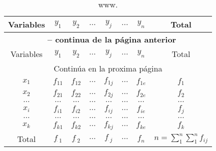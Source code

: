 \documentclass[a4paper]{report}
\begin{document}
\begin{longtable}{|c|cccccc|c|}
	\caption{www.}
	\label{tab:w}                                                                                                                     \\
	\hline
	Variables & $y_1$           & $y_2$           & $\ldots$ & $y_{j}$         & $\ldots$ & $y_n$    & Total                          \\
	\hline
	\endfirsthead
	\multicolumn{8}{c}{{\bfseries \tablename\ \thetable{} -- continua de la página anterior}}                                         \\
	\hline
	Variables & $y_1$           & $y_2$           & $\ldots$ & $y_{j}$         & $\ldots$ & $y_n$    & Total                          \\
	\hline
	\endhead
	\hline
	\multicolumn{8}{c}{{Continúa en la proxima página}}                                                                               \\
	\hline
	\endfoot
	\hline
	\endlastfoot
	$x_1$     & $f_{11}$        & $f_{12}$        & $\ldots$ & $f_{1j}$        & $\ldots$ & $f_{1e}$ & $f_1$                          \\
	$x_2$     & $f_{21}$        & $f_{22}$        & $\ldots$ & $f_{2j}$        & $\ldots$ & $f_{2e}$ & $f_2$                          \\
	$\ldots$  & $\ldots$        & $\ldots$        & $\ldots$ & $\ldots$        & $\ldots$ & $\ldots$ & $\ldots$                       \\
	$x_i$     & $f_{i1}$        & $f_{i2}$        & $\ldots$ & $f_{ij}$        & $\ldots$ & $f_{ie}$ & $f_j$                          \\
	$\ldots$  & $\ldots$        & $\ldots$        & $\ldots$ & $\ldots$        & $\ldots$ & $\ldots$ & $\ldots$                       \\
	$x_k$     & $f_{k1}$        & $f_{k2}$        & $\ldots$ & $f_{kj}$        & $\ldots$ & $f_{ke}$ & $f_k$                          \\
	\hline
	Total     & $f_{\dot \; 1}$ & $f_{\dot \; 2}$ & $\ldots$ & $f_{\dot \; j}$ & $\ldots$ & $f_n$    & $n=\sum_1^{n}\sum_1^{n}f_{ij}$ \\
\end{longtable}




\end{document}
